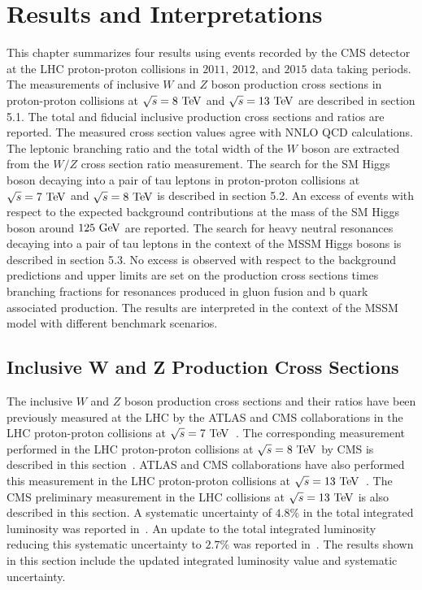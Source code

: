 \chapter{Results and Interpretations}

This chapter summarizes four results using events recorded by the CMS detector at the LHC proton-proton collisions in $2011$, $2012$, and $2015$ data taking periods. The measurements of inclusive $W$ and $Z$ boson production cross sections in proton-proton collisions at $\sqrt{s}=8~\mathrm{Te\kern -0.1em V}$ and $\sqrt{s}=13~\mathrm{Te\kern -0.1em V}$ are described in section 5.1. The total and fiducial inclusive production cross sections and ratios are reported. The measured cross section values agree with NNLO QCD calculations. The leptonic branching ratio and the total width of the $W$ boson are extracted from the $W/Z$ cross section ratio measurement. The search for the SM Higgs boson decaying into a pair of tau leptons in proton-proton collisions at $\sqrt{s}=7~\mathrm{Te\kern -0.1em V}$ and $\sqrt{s}=8~\mathrm{Te\kern -0.1em V}$ is described in section 5.2. An excess of events with respect to the expected background contributions at the mass of the SM Higgs boson around $125~\mathrm{Ge\kern -0.1em V}$ are reported. The search for heavy neutral resonances decaying into a pair of tau leptons in the context of the MSSM Higgs bosons is described in section 5.3. No excess is observed with respect to the background predictions and upper limits are set on the production cross sections times branching fractions for resonances produced in gluon fusion and b quark associated production. The results are interpreted in the context of the MSSM model with different benchmark scenarios.  
 
\section{Inclusive W and Z Production Cross Sections}

The inclusive $W$ and $Z$ boson production cross sections and their ratios have been previously measured at the LHC by the ATLAS and CMS collaborations in the LHC proton-proton collisions at $\sqrt{s}=7~\mathrm{Te\kern -0.1em V}$~\cite{CMS:2011aa,Chatrchyan:2011nv,Aad:2011dm}. The corresponding measurement performed in the LHC proton-proton collisions at $\sqrt{s}=8~\mathrm{Te\kern -0.1em V}$ by CMS is described in this section~\cite{Chatrchyan:2014mua}. ATLAS and CMS collaborations have also performed this measurement in the LHC proton-proton collisions at $\sqrt{s}=13~\mathrm{Te\kern -0.1em V}$~\cite{CMS-PAS-SMP-15-004,Aad:2016naf}. The CMS preliminary measurement in the LHC collisions at $\sqrt{s}=13~\mathrm{Te\kern -0.1em V}$ is also described in this section. A systematic uncertainty of $4.8\%$ in the total integrated luminosity was reported in~\cite{CMS-PAS-SMP-15-004}. An update to the total integrated luminosity  reducing this systematic uncertainty to $2.7\%$ was reported in~\cite{CMS-PAS-LUM-15-001}. The results shown in this section include the updated integrated luminosity value and systematic uncertainty.

